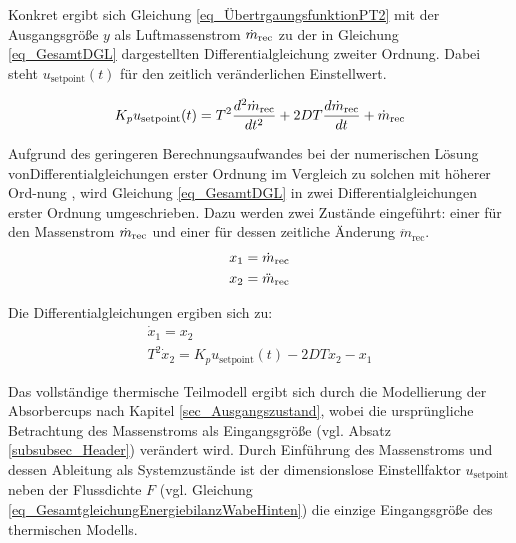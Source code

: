 Konkret ergibt sich Gleichung \ref{eq_ÜbertrgaungsfunktionPT2} mit der Ausgangsgröße $y$ als Luftmassenstrom $\dot{m}_{\mathrm{rec}}$ zu der in Gleichung \ref{eq_GesamtDGL} dargestellten Differentialgleichung zweiter Ordnung.
Dabei steht $u_{\mathrm{setpoint}}(t)$ für den zeitlich veränderlichen Einstellwert.

\begin{equation} \label{eq_GesamtDGL}
K_p u_{\mathrm{setpoint}}(t) = T^2 \frac{d^2\dot{m}_{\mathrm{rec}}}{dt^2} + 2 D T \frac{d\dot{m}_{\mathrm{rec}}}{dt} + \dot{m}_{\mathrm{rec}}
\end{equation}

Aufgrund des geringeren Berechnungsaufwandes bei der numerischen Lösung von\linebreak Differentialgleichungen erster Ordnung im Vergleich zu solchen mit höherer Ord-\linebreak nung \cite[S.138-139]{Gausch}\cite[S.241ff]{Howell}, wird Gleichung \ref{eq_GesamtDGL} in zwei Differentialgleichungen erster Ordnung umgeschrieben.
Dazu werden zwei Zustände eingeführt: einer für den Massenstrom $\dot{m}_{\mathrm{rec}}$ und einer für dessen zeitliche Änderung $\ddot{m}_{\mathrm{rec}}$.
\begin{equation} \label{eq_Einführtungstates}
\begin{gathered}
    x_1 = \dot{m}_{\mathrm{rec}}\\
    x_2 = \ddot{m}_{\mathrm{rec}}
\end{gathered}
\end{equation}

Die Differentialgleichungen ergiben sich zu:
\begin{equation} \label{eq_DGLsMassflow}
\begin{gathered}
    \dot{x}_1 = x_2\\
    T^2 \dot{x}_2 = K_p  u_{\mathrm{setpoint}}(t) - 2 D T x_2 - x_1
\end{gathered}
\end{equation}

\vspace*{-\baselineskip}Das vollständige thermische Teilmodell ergibt sich durch die Modellierung der Absorbercups nach Kapitel \ref{sec_Ausgangszustand}, wobei die ursprüngliche Betrachtung des Massenstroms als Eingangsgröße (vgl. Absatz \ref{subsubsec_Header}) verändert wird.
Durch Einführung des Massenstroms und dessen Ableitung als Systemzustände ist der dimensionslose Einstellfaktor $u_{\mathrm{setpoint}}$ neben der Flussdichte $F$ (vgl. Gleichung \ref{eq_GesamtgleichungEnergiebilanzWabeHinten}) die einzige Eingangsgröße des thermischen Modells.


